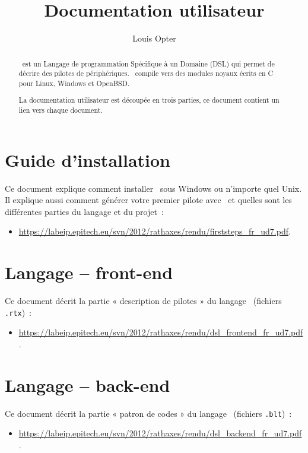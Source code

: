 \documentclass[francais]{rtxarticle}
\title{Documentation utilisateur}
\author{Louis Opter}
\begin{document}
\maketitle

\begin{abstract}
\rtx\ est un Langage de programmation Spécifique à un Domaine (DSL) qui permet
de décrire des pilotes de périphériques. \rtx\ compile vers des modules noyaux
écrits en C pour Linux, Windows et OpenBSD.

La documentation utilisateur est découpée en trois parties, ce document contient
un lien vers chaque document.
\end{abstract}

\section{Guide d'installation}

Ce document explique comment installer \rtx\ sous Windows ou n'importe quel
Unix. Il explique aussi comment générer votre premier pilote avec \rtx\ et
quelles sont les différentes parties du langage et du projet~:
\begin{itemize}
\item {\small\url{https://labeip.epitech.eu/svn/2012/rathaxes/rendu/firststeps_fr_ud7.pdf}}.
\end{itemize}

\section{Langage -- front-end}

Ce document décrit la partie « description de pilotes » du langage \rtx\
(fichiers \texttt{.rtx})~:
\begin{itemize}
\item {\small\url{https://labeip.epitech.eu/svn/2012/rathaxes/rendu/dsl_frontend_fr_ud7.pdf}}.
\end{itemize}

\section{Langage -- back-end}

Ce document décrit la partie « patron de codes » du langage \rtx\ (fichiers
\texttt{.blt})~:
\begin{itemize}
\item {\small\url{https://labeip.epitech.eu/svn/2012/rathaxes/rendu/dsl_backend_fr_ud7.pdf}}.
\end{itemize}
\end{document}
